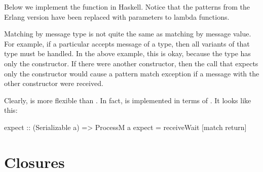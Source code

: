 \documentclass[preprint]{sigplanconf}
\begin{document}
Below we implement the  function in Haskell. Notice that the patterns from the Erlang version have been replaced with parameters to lambda functions.


Matching by message type is not quite the same as matching by message value. For example, if a particular  accepts message of a type, then all variants of that type must be handled. In the above example, this is okay, because the  type has only the  constructor. If there were another constructor, then the  call that expects only the  constructor would cause a pattern match exception if a message with the other constructor were received.

Clearly,  is more flexible than . In fact,  is implemented in terms of . It looks like this:

\begin{code}
expect :: (Serializable a) => ProcessM a
expect = receiveWait [match return]
\end{code}


\section{Closures}
\label{Closures}

\end{document}
